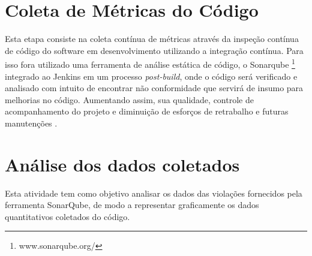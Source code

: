 \section{Coleta de Métricas do Código}
Esta etapa consiste na coleta contínua de métricas através da inspeção contínua de código do software em desenvolvimento utilizando a integração contínua. Para isso fora utilizado uma ferramenta de análise estática de código, o Sonarqube \footnote{www.sonarqube.org/} integrado ao Jenkins em um processo \textit{post-build}, onde o código será verificado e analisado com intuito de encontrar não conformidade que servirá de insumo para melhorias no código. Aumentando assim, sua qualidade, controle de acompanhamento do projeto e diminuição de esforços de retrabalho e futuras manutenções . 

\section{Análise dos dados coletados}
Esta atividade tem como objetivo analisar os dados das violações fornecidos pela ferramenta SonarQube, de modo a representar graficamente os dados quantitativos coletados do código.